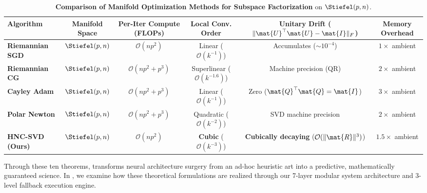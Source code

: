 \begin{table}[t]
\centering
\scriptsize
\caption[Manifold Optimization Methods for Subspace Factorization]{\textbf{Comparison of Manifold Optimization Methods for Subspace Factorization} on $\Stiefel(p, n)$.}
\label{tab:manifold_optimizers_comparison}
\begin{tabular}{lccccc}
\toprule
\textbf{Algorithm} & \textbf{Manifold Space} & \textbf{Per-Iter Compute (FLOPs)} & \textbf{Local Conv. Order} & \textbf{Unitary Drift ($\|\mat{U}^\top\mat{U} - \mat{I}\|_F$)} & \textbf{Memory Overhead} \\
\midrule
\textbf{Riemannian SGD} & $\Stiefel(p, n)$ & $\mathcal{O}(n p^2)$ & Linear ($\mathcal{O}(k^{-1})$) & Accumulates ($\sim 10^{-4}$) & $1\times$ ambient \\
\textbf{Riemannian CG} & $\Stiefel(p, n)$ & $\mathcal{O}(n p^2 + p^3)$ & Superlinear ($\mathcal{O}(k^{-1.6})$) & Machine precision (QR) & $2\times$ ambient \\
\textbf{Cayley Adam} & $\Stiefel(p, n)$ & $\mathcal{O}(n p^2 + p^3)$ & Linear ($\mathcal{O}(k^{-1})$) & Zero ($\mat{Q}^\top \mat{Q} = \mat{I}$) & $3\times$ ambient \\
\textbf{Polar Newton} & $\Stiefel(p, n)$ & $\mathcal{O}(n p^2 + p^3)$ & Quadratic ($\mathcal{O}(k^{-2})$) & SVD machine precision & $2\times$ ambient \\
\textbf{HNC-SVD (Ours)} & $\Stiefel(p, n)$ & $\mathcal{O}(n p^2)$ & \textbf{Cubic} ($\mathcal{O}(k^{-3})$) & \textbf{Cubically decaying} ($\mathcal{O}(\|\mat{R}\|^3)$) & $\mathbf{1.5\times}$ ambient \\
\bottomrule
\end{tabular}
\end{table}

Through these ten theorems, \neuralops{} transforms neural architecture surgery from an ad-hoc heuristic art into a predictive, mathematically guaranteed science. In , we examine how these theoretical formulations are realized through our 7-layer modular system architecture and 3-level fallback execution engine.
